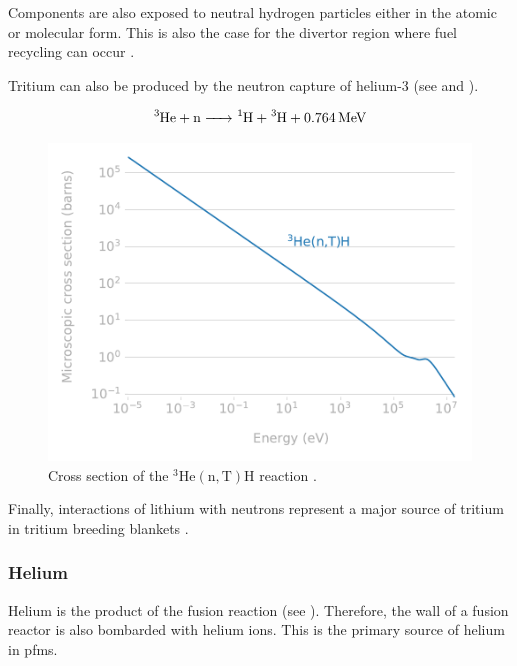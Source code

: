 Components are also exposed to neutral hydrogen particles either in the atomic or molecular form.
This is also the case for the \gls{divertor} region where \gls{fuel recycling} can occur .

Tritium can also be produced by the neutron capture of helium-3  (see  and ).

\begin{equation}
    \ce{^3He + n -> ^1H + ^3H + \SI{0.764}{MeV}}
    \labeq{he3 neutron capture reaction}
\end{equation}

\begin{figure}
    \centering
    \includegraphics[width=\linewidth]{Figures/Chapter1/cross_section_he3_neutron_capture.pdf}
    \caption{Cross section of the $^3\mathrm{He(n,T)H}$ reaction \cite{shimwell_xsplot_2021}.}
\end{figure}

Finally, interactions of lithium with neutrons represent a major source of tritium in tritium \glspl{breeding blanket} .

\subsubsection{Helium}
Helium is the product of the fusion reaction (see ).
Therefore, the wall of a fusion reactor is also bombarded with helium ions.
This is the primary source of helium in \glspl{pfm}.

